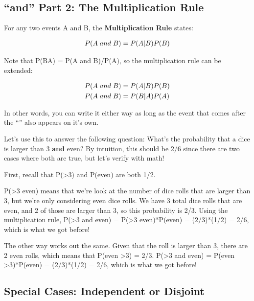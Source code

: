 \documentclass[
  letterpaper,
  DIV=11,
  numbers=noendperiod,
  oneside]{scrreprt}
\begin{document}
\hypertarget{and-part-2-the-multiplication-rule}{%
\subsection{``and'' Part 2: The Multiplication
Rule}\label{and-part-2-the-multiplication-rule}}

For any two events A and B, the \textbf{Multiplication Rule} states:

\begin{align*}
\small P(A\; and\; B) = P(A|B)P(B)
\end{align*}

Note that P(B\textbar A) = P(A and B)/P(A), so the multiplication rule
can be extended:

\begin{align*}
\small P(A\; and\; B) &\small = P(A|B)P(B)\\
\small P(A\; and\; B) &\small = P(B|A)P(A)
\end{align*}

In other words, you can write it either way as long as the event that
comes after the ``\textbar{}'' also appears on it's own.

Let's use this to answer the following question: What's the probability
that a dice is larger than 3 \textbf{and} even? By intuition, this
should be 2/6 since there are two cases where both are true, but let's
verify with math!

First, recall that P(\textgreater3) and P(even) are both 1/2.

P(\textgreater3 \textbar{} even) means that we're look at the number of
dice rolls that are larger than 3, but we're only considering even dice
rolls. We have 3 total dice rolls that are even, and 2 of those are
larger than 3, so this probability is 2/3. Using the multiplication
rule, P(\textgreater3 and even) = P(\textgreater3 \textbar{}
even)*P(even) = (2/3)*(1/2) = 2/6, which is what we got before!

The other way works out the same. Given that the roll is larger than 3,
there are 2 even rolls, which means that P(even \textbar{}
\textgreater3) = 2/3. P(\textgreater3 and even) = P(even \textbar{}
\textgreater3)*P(even) = (2/3)*(1/2) = 2/6, which is what we got before!

\hypertarget{special-cases-independent-or-disjoint}{%
\subsection{Special Cases: Independent or
Disjoint}\label{special-cases-independent-or-disjoint}}
\end{document}
